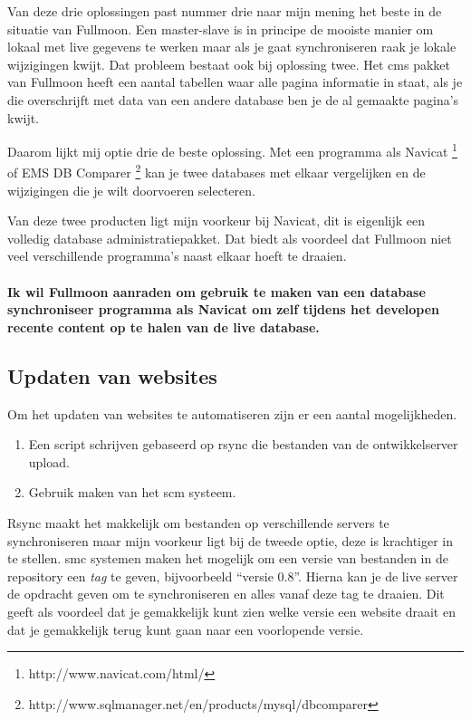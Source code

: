 \documentclass[12pt,a4paper]{article}
\begin{document}
    Van deze drie oplossingen past nummer drie naar mijn mening het beste in de situatie van Fullmoon. Een master-slave is in principe de mooiste manier om lokaal met live gegevens te werken maar als je gaat synchroniseren raak je lokale wijzigingen kwijt. Dat probleem bestaat ook bij oplossing twee. Het {\sc cms} pakket van Fullmoon heeft een aantal tabellen waar alle pagina informatie in staat, als je die overschrijft met data van een andere database ben je de al gemaakte pagina's kwijt.
    
    Daarom lijkt mij optie drie de beste oplossing. Met een programma als Navicat \footnote{ http://www.navicat.com/html/} of EMS DB Comparer \footnote{ http://www.sqlmanager.net/en/products/mysql/dbcomparer} kan je twee databases met elkaar vergelijken en de wijzigingen die je wilt doorvoeren selecteren.
    
    Van deze twee producten ligt mijn voorkeur bij Navicat, dit is eigenlijk een volledig database administratiepakket. Dat biedt als voordeel dat Fullmoon niet veel verschillende programma's naast elkaar hoeft te draaien.
    
    \paragraph{Ik wil Fullmoon aanraden om gebruik te maken van een database synchroniseer programma als Navicat om zelf tijdens het developen recente content op te halen van de live database.}
    
    \subsection{Updaten van websites}
  
    Om het updaten van websites te automatiseren zijn er een aantal mogelijkheden. 
    
    \begin{enumerate}
      \item Een script schrijven gebaseerd op {\sc rsync} die bestanden van de ontwikkelserver upload.
      \item Gebruik maken van het {\sc scm} systeem.
    \end{enumerate}
    
    Rsync maakt het makkelijk om bestanden op verschillende servers te synchroniseren maar mijn voorkeur ligt bij de tweede optie, deze is krachtiger in te stellen.
    {\sc smc} systemen maken het mogelijk om een versie van bestanden in de repository een \emph{tag} te geven, bijvoorbeeld ``versie 0.8''. Hierna kan je de live server de opdracht geven om te synchroniseren en alles vanaf deze tag te draaien. Dit geeft als voordeel dat je gemakkelijk kunt zien welke versie een website draait en dat je gemakkelijk terug kunt gaan naar een voorlopende versie.
    
\end{document}
